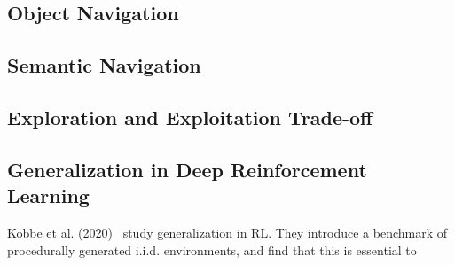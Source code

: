 \subsection{Object Navigation}


\subsection{Semantic Navigation}



\subsection{Exploration and Exploitation Trade-off}




\subsection{Generalization in Deep Reinforcement Learning}




Kobbe et al. (2020)~\cite{} study generalization in RL. They introduce a benchmark of procedurally generated i.i.d. environments, and find that this is essential to 

